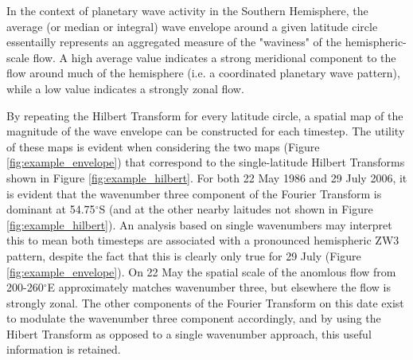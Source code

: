 In the context of planetary wave activity in the Southern Hemisphere, the average (or median or integral) wave envelope around a given latitude circle essentailly represents an aggregated measure of the "waviness" of the hemispheric-scale flow. A high average value indicates a strong meridional component to the flow around much of the hemisphere (i.e. a coordinated planetary wave pattern), while a low value indicates a strongly zonal flow. 

By repeating the Hilbert Transform for every latitude circle, a spatial map of the magnitude of the wave envelope can be constructed for each timestep. The utility of these maps is evident when considering the two maps (Figure \ref{fig:example_envelope}) that correspond to the single-latitude Hilbert Transforms shown in Figure \ref{fig:example_hilbert}. For both 22 May 1986 and 29 July 2006, it is evident that the wavenumber three component of the Fourier Transform is dominant at 54.75$^{\circ}$S (and at the other nearby laitudes not shown in Figure \ref{fig:example_hilbert}). An analysis based on single wavenumbers may interpret this to mean both timesteps are associated with a pronounced hemispheric ZW3 pattern, despite the fact that this is clearly only true for 29 July (Figure \ref{fig:example_envelope}). On 22 May the spatial scale of the anomlous flow from 200-260$^{\circ}$E approximately matches wavenumber three, but elsewhere the flow is strongly zonal. The other components of the Fourier Transform on this date exist to modulate the wavenumber three component accordingly, and by using the Hibert Transform as opposed to a single wavenumber approach, this useful information is retained.
